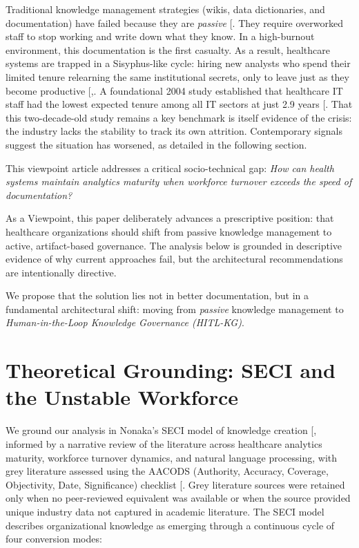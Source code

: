 \documentclass[
  american,
  11pt,
  letterpaper,
  oneside  ,captions=tableheading
]{scrartcl}
\begin{document}
Traditional knowledge management strategies (wikis, data dictionaries,
and documentation) have failed because they are \emph{passive}
{[}\citeproc{ref-mayo2016}{12}{]}. They require overworked staff to stop
working and write down what they know. In a high-burnout environment,
this documentation is the first casualty. As a result, healthcare
systems are trapped in a Sisyphus-like cycle: hiring new analysts who
spend their limited tenure relearning the same institutional secrets,
only to leave just as they become productive
{[},\citeproc{ref-mantas2010}{14}{]}. A
foundational 2004 study established that healthcare IT staff had the
lowest expected tenure among all IT sectors at just 2.9 years
{[}\citeproc{ref-ang2004}{15}{]}. That this two-decade-old study remains
a key benchmark is itself evidence of the crisis: the industry lacks the
stability to track its own attrition. Contemporary signals suggest the
situation has worsened, as detailed in the following section.

This viewpoint article addresses a critical socio-technical gap:
\emph{How can health systems maintain analytics maturity when workforce
turnover exceeds the speed of documentation?}

As a Viewpoint, this paper deliberately advances a prescriptive
position: that healthcare organizations should shift from passive
knowledge management to active, artifact-based governance. The analysis
below is grounded in descriptive evidence of why current approaches
fail, but the architectural recommendations are intentionally directive.

We propose that the solution lies not in better documentation, but in a
fundamental architectural shift: moving from \emph{passive} knowledge
management to \emph{Human-in-the-Loop Knowledge Governance (HITL-KG)}.

\section{Theoretical Grounding: SECI and the Unstable
Workforce}\label{theoretical-grounding-seci-and-the-unstable-workforce}

We ground our analysis in Nonaka's SECI model of knowledge creation
{[}\citeproc{ref-farnese2019}{16}{]}, informed by a narrative review of
the literature across healthcare analytics maturity, workforce turnover
dynamics, and natural language processing, with grey literature assessed
using the AACODS (Authority, Accuracy, Coverage, Objectivity, Date,
Significance) checklist {[}\citeproc{ref-tyndall2010}{17}{]}. Grey
literature sources were retained only when no peer-reviewed equivalent
was available or when the source provided unique industry data not
captured in academic literature. The SECI model describes organizational
knowledge as emerging through a continuous cycle of four conversion
modes:
\end{document}
